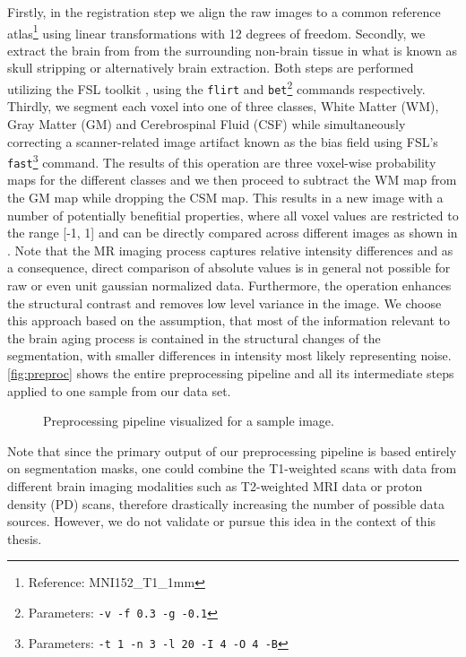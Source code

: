 Firstly, in the registration step we align the raw images to a common reference atlas\footnote{Reference: MNI152\_T1\_1mm} using linear transformations with 12 degrees of freedom. Secondly, we extract the brain from from the surrounding non-brain tissue in what is known as skull stripping or alternatively brain extraction. Both steps are performed utilizing the FSL toolkit \cite{jenkinson2012fsl}, using the \texttt{flirt} \cite{jenkinson2001global} \cite{jenkinson2002improved} and \texttt{bet}\footnote{Parameters: \texttt{-v -f 0.3 -g -0.1}} \cite{smith2002fast} \cite{jenkinson2005bet2} commands respectively. Thirdly, we segment each voxel into one of three classes, White Matter (WM), Gray Matter (GM) and Cerebrospinal Fluid (CSF) while simultaneously correcting a scanner-related image artifact known as the bias field using FSL's \texttt{fast}\footnote{Parameters: \texttt{-t 1 -n 3 -l 20 -I 4 -O 4 -B}} \cite{zhang2001segmentation} command. The results of this operation are three voxel-wise probability maps for the different classes and we then proceed to subtract the WM map from the GM map while dropping the CSM map. This results in a new image with a number of potentially benefitial properties, where all voxel values are restricted to the range [-1, 1] and can be directly compared across different images as shown in \cite{de2018clinically}. Note that the MR imaging process captures relative intensity differences and as a consequence, direct comparison of absolute values is in general not possible for raw or even unit gaussian normalized data. Furthermore, the operation enhances the structural contrast and removes low level variance in the image. We choose this approach based on the assumption, that most of the information relevant to the brain aging process is contained in the structural changes of the segmentation, with smaller differences in intensity most likely representing noise. \autoref{fig:preproc} shows the entire preprocessing pipeline and all its intermediate steps applied to one sample from our data set.


\begin{figure}
	\noindent\makebox[1.1\textwidth]{
		\centering
		
	}
	\caption{Preprocessing pipeline visualized for a sample image.}
	\label{fig:preproc}
\end{figure}

Note that since the primary output of our preprocessing pipeline is based entirely on segmentation masks, one could combine the T1-weighted scans with data from different brain imaging modalities such as T2-weighted MRI data or proton density (PD) scans, therefore drastically increasing the number of possible data sources. However, we do not validate or pursue this idea in the context of this thesis.

